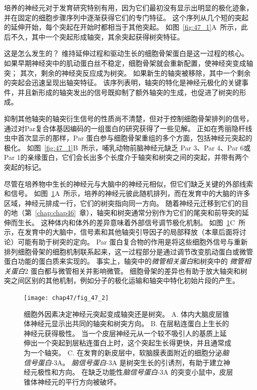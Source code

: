 培养的神经元对于发育研究特别有用，因为它们最初没有显示出明显的极化迹象，并在固定的细胞步骤序列中逐渐获得它们的专门特征。
这个序列从几个短的突起的延伸开始，每个突起在开始时都相当于其他突起。
如图~\ref{fig:47_1}A~所示，此后不久，其中一个突起形成轴突，其余突起获得树突特征。


这是怎么发生的？
维持延伸过程和驱动生长的细胞骨架蛋白是这一过程的核心。
如果早期神经突中的肌动蛋白丝不稳定，细胞骨架就会重新配置，使神经突变成轴突；
其次，剩余的神经突反应成为树突。
如果新生的轴突被移除，其中一个剩余的突起会迅速呈现出轴突特征。
该序列表明，轴突的特化是神经元极化的关键事件，并且新形成的轴突发出的信号既抑制了额外轴突的生成，也促进了树突的形成。


抑制其他轴突的轴突衍生信号的性质尚不清楚，但对于控制细胞骨架排列的信号，通过对Par复合体基因编码的一组蛋白的研究获得了一些见解。
正如在秀丽隐杆线虫中首次显示的那样，Par 蛋白参与细胞骨架重组的多个方面，包括神经元突起的极化。
如图~\ref{fig:47_1}B~所示，哺乳动物前脑神经元缺乏 Par 3、Par 4、Par 6或Par 1的亲缘蛋白，它们会长出多个长度介于轴突和树突之间的突起，并带有两个突起的标记。


尽管在培养物中生长的神经元与大脑中的神经元相似，但它们缺乏关键的外部线索和信号。
如图~\ref{fig:47_2}A~所示，培养的神经元彼此随机排列，而在发育中的大脑的许多区域，神经元排成一行，它们的树突指向同一方向。
随着神经元迁移到它们的目的地（第~\ref{chap:chap46}~章），轴突和树突通常分别作为它们的尾突和前导突的延伸而生长。
这种体内和体外的差异意味着外部信号调节极化机制。
如图~\ref{fig:47_2}C~所示，在发育中的大脑中，信号素和其他轴突引导因子的局部释放（本章后面将讨论）可能有助于树突的定向。
Par 蛋白复合物的作用是将这些细胞外信号与重新排列细胞骨架的细胞机制联系起来，这一过程部分是通过调节改变肌动蛋白或微管蛋白功能的蛋白质来实现的。
事实上，轴突中的\textit{微管相关蛋白}和树突中的 \textit{微管相关蛋白}2 蛋白都与微管相关并影响微管。
细胞骨架的差异也有助于放大轴突和树突之间区别的其他机制，例如分子的极化运输和轴突中特化初始片段的产生。


\begin{figure}[htbp]
	\centering
	\texttt{[image: chap47/fig\_47\_2]}
	\caption{细胞外因素决定神经元突起变成轴突还是树突。
		A. 体内大脑皮层锥体神经元显示出共同的轴突和树突方向。
		B. 在层粘连蛋白上生长的神经元获得极性。
		当一个皮层神经元从一个较不吸引人的基质上延伸出一个突起到层粘连蛋白上时，这个突起生长得更快，并且通常成为一个轴突。
		C. 在发育的新皮层中，软脑膜表面附近的细胞分泌\textit{脑信号蛋白}-3A。
		\textit{脑信号蛋白}-3A 是树突生长的引诱剂，有助于建立神经元极性和方向。
		在缺乏功能性\textit{脑信号蛋白}-3A 的突变小鼠中，皮层锥体神经元的平行方向被破坏。}
	\label{fig:47_2}
\end{figure}


